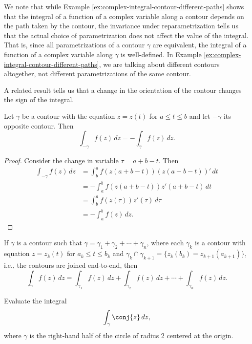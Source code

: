 We note that while Example \ref{ex:complex-integral-contour-different-paths}
shows that the integral of a function of a complex variable along a contour
depends on the path taken by the contour, the invariance under reparametrization
tells us that the actual choice of parametrization does not affect the value of
the integral. That is, since all parametrizations of a contour \(\gamma\) are
equivalent, the integral of a function of a complex variable along \(\gamma\) is
well-defined. In Example \ref{ex:complex-integral-contour-different-paths}, we
are talking about different contours altogether, not different parametrizations
of the same contour.

A related result tells us that a change in the orientation of the contour
changes the sign of the integral.

\begin{theorem}
    Let \(\gamma\) be a contour with the equation \(z = z(t)\) for \(a \leq t
    \leq b\) and let \(-\gamma\) its opposite contour. Then
    \[
        \int_{-\gamma} f(z) \, dz = -\int_\gamma f(z) \, dz.
    \]
    \label{thm:opposite-contour}
\end{theorem}

\begin{proof}
    Consider the change in variable \(\tau = a + b - t\). Then
    \begin{align*}
        \int_{-\gamma} f(z) \, dz &= \int_{b}^{a} f(z(a + b - t)) (z(a + b - t))' \, dt \\
        &= -\int_{a}^{b} f(z(a + b - t)) z'(a + b - t) \, dt \\
        &= \int_b^a f(z(\tau)) z'(\tau) \, d\tau \\
        &= -\int_a^b f(z) \, dz.
    \end{align*}
\end{proof}

\begin{theorem}
    If \(\gamma\) is a contour such that \(\gamma = \gamma_1 + \gamma_2 + \cdots + \gamma_n\), where each \(\gamma_k\) is a contour with equation \(z = z_k(t)\) for \(a_k \leq t \leq b_k\) and \(\gamma_k \cap \gamma_{k+1} = \{z_k(b_k) = z_{k+1}(a_{k+1})\}\), i.e., the contours are joined end-to-end, then
    \[
        \int_\gamma f(z) \, dz = \int_{\gamma_1} f(z) \, dz + \int_{\gamma_2} f(z) \, dz + \cdots + \int_{\gamma_n} f(z) \, dz.
    \]
\end{theorem}

\begin{example}
    Evaluate the integral
    \[
        \int_{\gamma} \conj{z} \, dz,
    \]
    where \(\gamma\) is the right-hand half of the circle of radius \(2\)
    centered at the origin.
\end{example}



